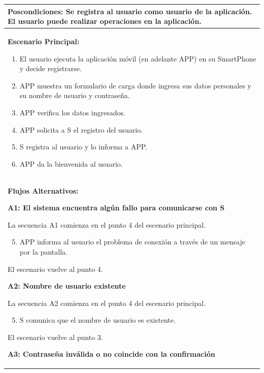 \begin{longtable}{|l|p{5.5cm}|l|p{2cm}|l|p{1.9cm}|}
    \multicolumn{6}{|p{15cm}|}{ \textbf{Poscondiciones: } Se registra al usuario como usuario de la aplicación. El usuario puede realizar operaciones en la aplicación.

    } \\ \hline

    \multicolumn{6}{|p{15cm}|}{ \textbf{Escenario Principal: }
        \begin{enumerate}
            \item El usuario ejecuta la aplicación móvil (en adelante APP) en su SmartPhone y decide registrarse.
            \item APP muestra un formulario de carga donde ingresa sus datos personales y su nombre de usuario y contraseña.
            \item APP verifica los datos ingresados.
            \item APP solicita a S el registro del usuario.
            \item S registra al usuario y lo informa a APP.
            \item APP da la bienvenida al usuario.
        \end{enumerate}

    } \\ \hline

    \multicolumn{6}{|p{15cm}|}{ \textbf{Flujos Alternativos: }

    \textbf{A1: El sistema encuentra algún fallo para comunicarse con S}

    La secuencia A1 comienza en el punto 4 del escenario principal.
    \begin{enumerate}
        \setcounter{enumi}{4}
        \item APP informa al usuario el problema de conexión a través de un mensaje por la pantalla.
    \end{enumerate}

    El escenario vuelve al punto 4.

    \textbf{A2: Nombre de usuario existente}
    
    La secuencia A2 comienza en el punto 4 del escenario principal.
    \begin{enumerate}
        \setcounter{enumi}{4}
        \item S comunica que el nombre de usuario es existente.
    \end{enumerate}

    El escenario vuelve al punto 3.

    \textbf{A3: Contraseña inválida o no coincide con la confirmación}
    
}
\end{longtable}

